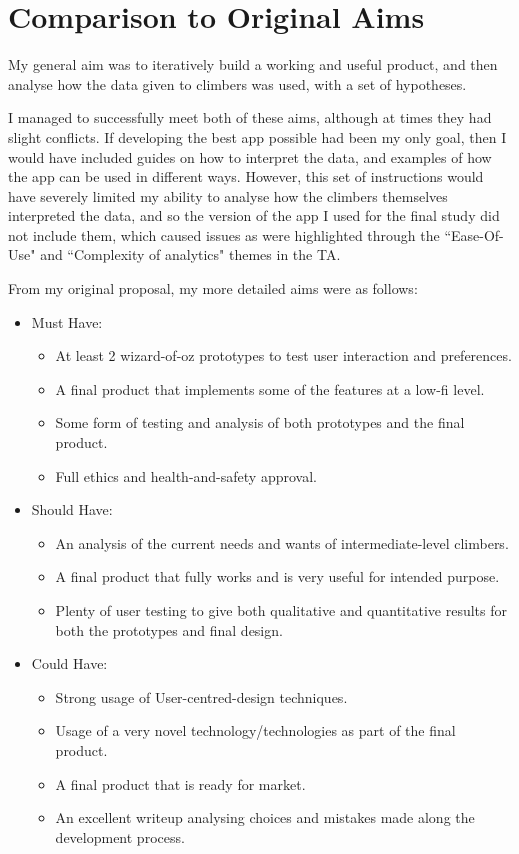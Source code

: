 \section{Comparison to Original Aims}
My general aim was to iteratively build a working and useful product, and then analyse how the data given to climbers was used, with a set of hypotheses.

I managed to successfully meet both of these aims, although at times they had slight conflicts. \label{aimsconf}
If developing the best app possible had been my only goal, then I would have included guides on how to interpret the data, and examples of how the app can be used in different ways.
However, this set of instructions would have severely limited my ability to analyse how the climbers themselves interpreted the data, and so the version of the app I used for the final study did not include them, which caused issues as were highlighted through the ``Ease-Of-Use" and ``Complexity of analytics" themes in the TA.


From my original proposal, my more detailed aims were as follows:
\begin{itemize}
    \item Must Have:
    \begin{itemize}
        \item  At least 2 wizard-of-oz prototypes to test user interaction and preferences.
        \item A final product that implements some of the features at a low-fi level.
        \item  Some form of testing and analysis of both prototypes and the final product.
        \item Full ethics and health-and-safety approval.
    \end{itemize}
    
    \item Should Have:
    \begin{itemize}
        \item An analysis of the current needs and wants of intermediate-level climbers.
        \item A final product that fully works and is very useful for intended purpose.
        \item Plenty of user testing to give both qualitative and quantitative results for both the prototypes and final design.
    \end{itemize}
    
    \item Could Have: 
    \begin{itemize}
        \item Strong usage of User-centred-design techniques.
        \item Usage of a very novel technology/technologies as part of the final product.
        \item A final product that is ready for market.
        \item An excellent writeup analysing choices and mistakes made along the development process.
    \end{itemize}
\end{itemize}

